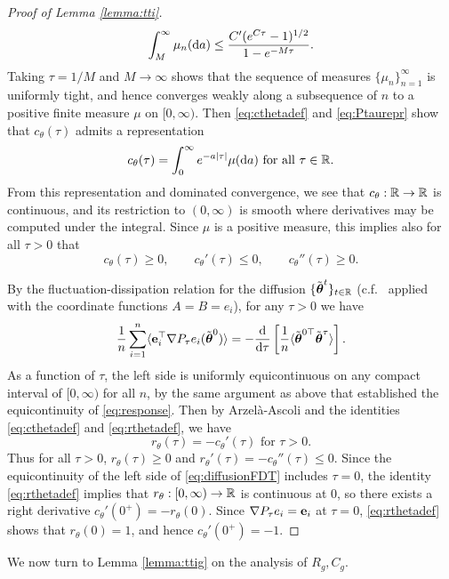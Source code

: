 \begin{proof}[Proof of Lemma \ref{lemma:tti}]
\[\int_M^\infty \mu_n(\mathrm{d} a) \leq \frac{C'(e^{C\tau}-1)^{1/2}}{1-e^{-M\tau}}.\]
Taking $\tau=1/M$ and $M \to \infty$ shows that the sequence of measures
$\{\mu_n\}_{n=1}^\infty$ is uniformly tight, and hence converges weakly along a
subsequence of $n$ to a positive finite measure $\mu$ on $[0,\infty)$. Then
\eqref{eq:cthetadef} and \eqref{eq:Ptaurepr}
show that $c_\theta(\tau)$ admits a representation
\begin{equation}\label{eq:cthetarepr}
c_\theta(\tau)=\int_0^\infty e^{-a|\tau|} \mu(\mathrm{d} a) \text{ for all } \tau \in
\mathbb{R}.
\end{equation}
From this representation and dominated convergence, we see that
$c_\theta:\mathbb{R} \to \mathbb{R}$ is continuous, and its restriction to $(0,\infty)$ is
smooth where derivatives may be computed under the integral. Since
$\mu$ is a positive measure, this implies also for all $\tau>0$ that
\[c_\theta(\tau) \geq 0,
\qquad c_\theta'(\tau) \leq 0, \qquad c_\theta''(\tau) \geq 0.\]

By the fluctuation-dissipation relation for the diffusion
$\{\tilde {\boldsymbol{\theta}}^t\}_{t \in \mathbb{R}}$ (c.f.\ \cite[Lemma
4.1]{fan2025dynamicalII} applied with the coordinate functions $A=B=e_i$),
for any $\tau>0$ we have
\begin{equation}\label{eq:diffusionFDT}
\frac{1}{n}\sum_{i=1}^n \langle \mathbf{e}_i^\top \nabla P_\tau e_i(\tilde {\boldsymbol{\theta}}^0)
\rangle={-}\frac{\mathrm{d}}{\mathrm{d} \tau}
\left[\frac{1}{n}\langle \tilde {\boldsymbol{\theta}}^{0\top}\tilde {\boldsymbol{\theta}}^\tau
\rangle\right].
\end{equation}
As a function of $\tau$, the left side is uniformly equicontinuous 
on any compact interval of $[0,\infty)$ for all $n$, by the same argument as
above that established the equicontinuity of \eqref{eq:response}. Then
by Arzel\`a-Ascoli and the identities \eqref{eq:cthetadef}
and \eqref{eq:rthetadef}, we have
\[r_\theta(\tau)=-c_\theta'(\tau) \text{ for } \tau>0.\]
Thus for all $\tau>0$,
$r_\theta(\tau) \geq 0$ and $r_\theta'(\tau)={-}c_\theta''(\tau) \leq 0$.
Since the equicontinuity of the left side of \eqref{eq:diffusionFDT}
includes $\tau=0$, the identity
\eqref{eq:rthetadef} implies that $r_\theta:[0,\infty) \to \mathbb{R}$ is continuous at
0, so there exists a right derivative $c_\theta'(0^+)={-}r_\theta(0)$. Since
$\nabla P_\tau e_i=\mathbf{e}_i$ at $\tau=0$, \eqref{eq:rthetadef} shows that
$r_\theta(0)=1$, and hence $c_\theta'(0^+)=-1$.
\end{proof}

We now turn to Lemma \ref{lemma:ttig} on the analysis of $R_g,C_g$.


